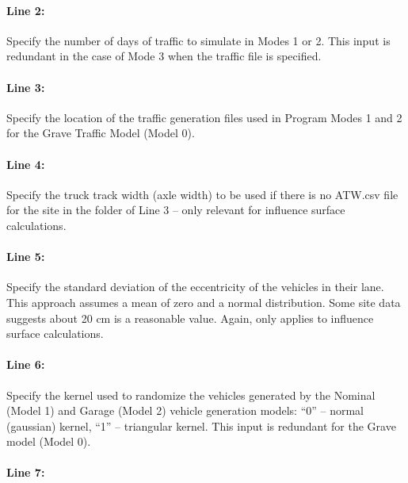 \documentclass[
]{article}
\begin{document}
\paragraph*{Line 2:}\label{line-2}

Specify the number of days of traffic to simulate in Modes 1 or 2. This
input is redundant in the case of Mode 3 when the traffic file is
specified.

\paragraph*{Line 3:}\label{line-3}

Specify the location of the traffic generation files used in Program
Modes 1 and 2 for the Grave Traffic Model (Model 0).

\paragraph*{Line 4:}\label{line-4}

Specify the truck track width (axle width) to be used if there is no
ATW.csv file for the site in the folder of Line 3 -- only relevant for
influence surface calculations.

\paragraph*{Line 5:}\label{line-5}

Specify the standard deviation of the eccentricity of the vehicles in
their lane. This approach assumes a mean of zero and a normal
distribution. Some site data suggests about 20 cm is a reasonable value.
Again, only applies to influence surface calculations.

\paragraph*{Line 6:}\label{line-6}

Specify the kernel used to randomize the vehicles generated by the
Nominal (Model 1) and Garage (Model 2) vehicle generation models: ``0''
-- normal (gaussian) kernel, ``1'' -- triangular kernel. This input is
redundant for the Grave model (Model 0).

\paragraph*{Line 7:}\label{line-7}
\end{document}
